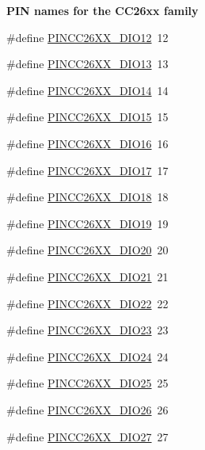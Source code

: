 \begin{Indent}{\bf P\-I\-N names for the C\-C26xx family}
\begin{DoxyCompactItemize}
\item 
\#define \hyperlink{_p_i_n_c_c26_x_x_8h_a8587d8b01ff58a9e44c69f681a8a5403}{P\-I\-N\-C\-C26\-X\-X\-\_\-\-D\-I\-O12}~12
\item 
\#define \hyperlink{_p_i_n_c_c26_x_x_8h_a9054f3638cfc519f1120c93cebcc74af}{P\-I\-N\-C\-C26\-X\-X\-\_\-\-D\-I\-O13}~13
\item 
\#define \hyperlink{_p_i_n_c_c26_x_x_8h_a5f954c43ab868ba10c1cb0b56b637069}{P\-I\-N\-C\-C26\-X\-X\-\_\-\-D\-I\-O14}~14
\item 
\#define \hyperlink{_p_i_n_c_c26_x_x_8h_ac2fa80ad26e292a57acd40aad35706cc}{P\-I\-N\-C\-C26\-X\-X\-\_\-\-D\-I\-O15}~15
\item 
\#define \hyperlink{_p_i_n_c_c26_x_x_8h_a7c33d96405c6b258fc9f64192d7d11a6}{P\-I\-N\-C\-C26\-X\-X\-\_\-\-D\-I\-O16}~16
\item 
\#define \hyperlink{_p_i_n_c_c26_x_x_8h_a8bdc44b33a921952a875b232ba90eece}{P\-I\-N\-C\-C26\-X\-X\-\_\-\-D\-I\-O17}~17
\item 
\#define \hyperlink{_p_i_n_c_c26_x_x_8h_afdc8f81dd314d58587b0b563c9bcd915}{P\-I\-N\-C\-C26\-X\-X\-\_\-\-D\-I\-O18}~18
\item 
\#define \hyperlink{_p_i_n_c_c26_x_x_8h_a3368bb8b764b71fa0317542678645fcf}{P\-I\-N\-C\-C26\-X\-X\-\_\-\-D\-I\-O19}~19
\item 
\#define \hyperlink{_p_i_n_c_c26_x_x_8h_a375944150318e9210f12e0fe82b81948}{P\-I\-N\-C\-C26\-X\-X\-\_\-\-D\-I\-O20}~20
\item 
\#define \hyperlink{_p_i_n_c_c26_x_x_8h_a93ece28a1be27fb6d8202ae4f30e2d47}{P\-I\-N\-C\-C26\-X\-X\-\_\-\-D\-I\-O21}~21
\item 
\#define \hyperlink{_p_i_n_c_c26_x_x_8h_a1d0d4bed8aa48e5b15c2408ad4099a9a}{P\-I\-N\-C\-C26\-X\-X\-\_\-\-D\-I\-O22}~22
\item 
\#define \hyperlink{_p_i_n_c_c26_x_x_8h_ae0dd08058f49a45575f9886b9f38b906}{P\-I\-N\-C\-C26\-X\-X\-\_\-\-D\-I\-O23}~23
\item 
\#define \hyperlink{_p_i_n_c_c26_x_x_8h_a06de9b0fd8670e462d81163baf7b2808}{P\-I\-N\-C\-C26\-X\-X\-\_\-\-D\-I\-O24}~24
\item 
\#define \hyperlink{_p_i_n_c_c26_x_x_8h_ab91d047da997d30fbf36c0e23dafa2af}{P\-I\-N\-C\-C26\-X\-X\-\_\-\-D\-I\-O25}~25
\item 
\#define \hyperlink{_p_i_n_c_c26_x_x_8h_a5e2ac43aec42da85be2a5e1696982c07}{P\-I\-N\-C\-C26\-X\-X\-\_\-\-D\-I\-O26}~26
\item 
\#define \hyperlink{_p_i_n_c_c26_x_x_8h_a93cb24d016cf016c185206b8e7011e32}{P\-I\-N\-C\-C26\-X\-X\-\_\-\-D\-I\-O27}~27

\end{DoxyCompactItemize}
\end{Indent}

